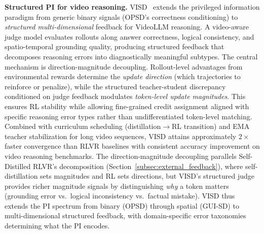 \documentclass{article} %
\begin{document}
\textbf{Structured PI for video reasoning.} VISD~\citep{2605.06094} extends the privileged information paradigm from generic binary signals (OPSD's correctness conditioning) to \emph{structured multi-dimensional} feedback for VideoLLM reasoning. A video-aware judge model evaluates rollouts along answer correctness, logical consistency, and spatio-temporal grounding quality, producing structured feedback that decomposes reasoning errors into diagnostically meaningful subtypes. The central mechanism is direction-magnitude decoupling. Rollout-level advantages from environmental rewards determine the \emph{update direction} (which trajectories to reinforce or penalize), while the structured teacher-student discrepancy conditioned on judge feedback modulates \emph{token-level update magnitudes}. This ensures RL stability while allowing fine-grained credit assignment aligned with specific reasoning error types rather than undifferentiated token-level matching. Combined with curriculum scheduling (distillation$\to$RL transition) and EMA teacher stabilization for long video sequences, VISD attains approximately $2\times$ faster convergence than RLVR baselines with consistent accuracy improvement on video reasoning benchmarks. The direction-magnitude decoupling parallels Self-Distilled RLVR's decomposition (Section~\ref{subsec:external_feedback}), where self-distillation sets magnitudes and RL sets directions, but VISD's structured judge provides richer magnitude signals by distinguishing \emph{why} a token matters (grounding error vs.\ logical inconsistency vs.\ factual mistake). VISD thus extends the PI spectrum from binary (OPSD) through spatial (GUI-SD) to multi-dimensional structured feedback, with domain-specific error taxonomies determining what the PI encodes.
\end{document}
